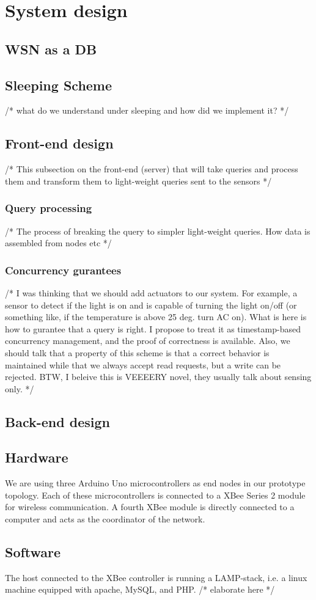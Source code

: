 \section{System design}\label{sec:design}

\subsection{WSN as a DB}
\subsection{Sleeping Scheme}
/* what do we understand under sleeping and how did we implement it? */


\subsection{Front-end design}
/* This subsection on the front-end (server) that will take queries and process them and transform them to light-weight queries sent to the sensors */

\subsubsection{Query processing}
/* The process of breaking the query to simpler light-weight queries. How data is assembled from nodes etc */

\subsubsection{Concurrency gurantees}
/* I was thinking that we should add actuators to our system. For example, a sensor to detect if the light is on and is capable of turning the light on/off (or something like, if the temperature is above 25 deg. turn AC on). What is here is how to gurantee that a query is right. I propose to treat it as timestamp-based concurrency management, and the proof of correctness is available. Also, we should talk that a property of this scheme is that a correct behavior is maintained while that we always accept read requests, but a write can be rejected.
BTW, I beleive this is VEEEERY novel, they usually talk about sensing only.
 */

\subsection{Back-end design}

\subsection{Hardware}
We are using three Arduino Uno microcontrollers as end nodes in our prototype topology. Each of these microcontrollers is connected to a XBee Series 2 module for wireless communication. A fourth XBee module is directly connected to a computer and acts as the coordinator of the network.

\subsection{Software}
The host connected to the XBee controller is running a LAMP-stack, i.e. a linux machine equipped with apache, MySQL, and PHP.
/* elaborate here */


